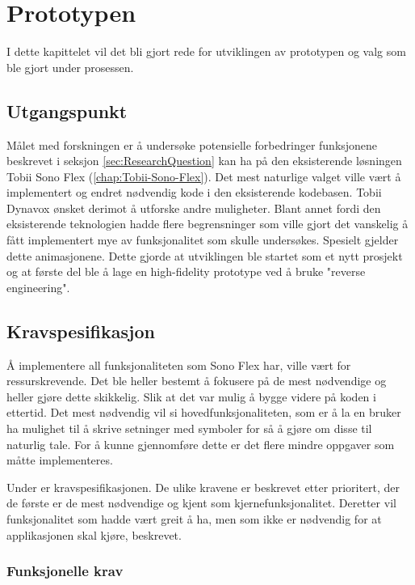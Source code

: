  
 
\chapter{Prototypen} 

I dette kapittelet vil det bli gjort rede for utviklingen av prototypen og valg som ble gjort under prosessen. 
 
 
\section{Utgangspunkt} 
\label{sec:utgangspunkt} 
 
Målet med forskningen er å undersøke potensielle forbedringer funksjonene beskrevet i seksjon \ref{sec:ResearchQuestion} kan ha på den eksisterende løsningen Tobii Sono Flex (\ref{chap:Tobii-Sono-Flex}). Det mest naturlige valget ville vært å implementert og endret nødvendig kode i den eksisterende kodebasen. Tobii Dynavox ønsket derimot å utforske andre muligheter. Blant annet fordi den eksisterende teknologien hadde flere begrensninger som ville gjort det vanskelig å fått implementert mye av funksjonalitet som skulle undersøkes. Spesielt gjelder dette animasjonene. Dette gjorde at utviklingen ble startet som et nytt prosjekt og at første del ble å lage en high-fidelity prototype ved å bruke "reverse engineering".


 
\section{Kravspesifikasjon} 
 
Å implementere all funksjonaliteten som Sono Flex har, ville vært for ressurskrevende. Det ble heller bestemt å fokusere på de mest nødvendige og heller gjøre dette skikkelig. Slik at det var mulig å bygge videre på koden i ettertid. Det mest nødvendig vil si hovedfunksjonaliteten, som er å la en bruker ha mulighet til å skrive setninger med symboler for så å gjøre om disse til naturlig tale. For å kunne gjennomføre dette er det flere mindre oppgaver som måtte implementeres. 

Under er kravspesifikasjonen. De ulike kravene er beskrevet etter prioritert, der de første er de mest nødvendige og kjent som kjernefunksjonalitet. Deretter vil funksjonalitet som hadde vært greit å ha, men som ikke er nødvendig for at applikasjonen skal kjøre, beskrevet.  
 
\subsection{Funksjonelle krav} 
 
